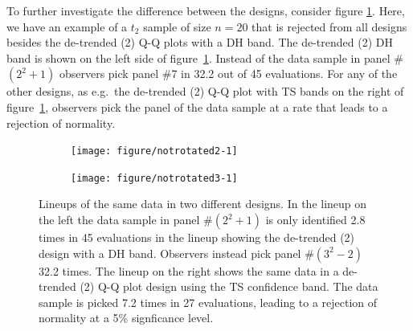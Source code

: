 \documentclass{article}\usepackage[]{graphicx}\usepackage[]{color}
\newenvironment{knitrout}{}{} %
\newcommand{\hh}[1]{{\color{magenta} #1}}
\begin{document}
To further investigate the difference between the designs, consider figure \ref{fig:rotstd}. Here, we have an example of a $t_2$ sample of size $n=20$ that is rejected \hh{from all designs besides the de-trended (2) Q-Q plots with a DH band.}  
\hh{The de-trended (2) DH band is shown on the left side of figure~\ref{fig:rotstd}. Instead of the data sample in panel \#$(2^2+1)$ observers pick panel \#7 in 32.2 out of 45 evaluations. For any of the other designs, as e.g.\ the de-trended (2) Q-Q plot with TS bands on the right of figure~\ref{fig:rotstd}, observers pick the panel of the data sample at a rate that leads to a rejection of normality.  }
\begin{figure}[hbt]

\begin{subfigure}{0.5\textwidth}
\begin{knitrout}
\color{fgcolor}
\texttt{[image: figure/notrotated2-1]} 

\end{knitrout}
\end{subfigure}
\begin{subfigure}{0.5\textwidth}
\begin{knitrout}
\color{fgcolor}
\texttt{[image: figure/notrotated3-1]} 

\end{knitrout}
\end{subfigure}
\caption{\label{fig:rotstd}Lineups of the same data in two different designs. %
In the lineup on the left the data sample in panel \#$(2^2+1)$ is only identified \hh{2.8 times in 45} evaluations in the lineup showing the de-trended (2) design \hh{with a DH band}. Observers instead pick panel \#$(3^2-2)$ \hh{32.2} times. \hh{The lineup on the right shows the same data in a de-trended (2) Q-Q plot design using the TS confidence band. The data sample is picked 7.2 times in 27 evaluations, leading to a rejection of normality at a 5\% signficance level.}}
\end{figure}
\afterpage{\clearpage}
\end{document}

